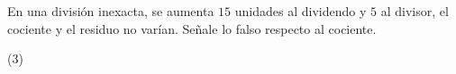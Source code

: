 \item{En una división inexacta, se aumenta $15$ unidades al dividendo y $5$ al divisor, el cociente y el residuo no varían. Señale lo falso respecto al cociente.
	\begin{tasks}(3)
	\end{tasks}
}
